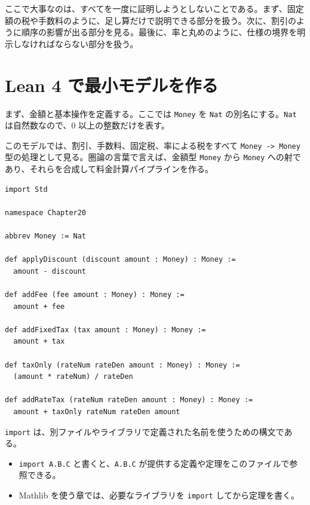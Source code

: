 ここで大事なのは、すべてを一度に証明しようとしないことである。まず、固定額の税や手数料のように、足し算だけで説明できる部分を扱う。次に、割引のように順序の影響が出る部分を見る。最後に、率と丸めのように、仕様の境界を明示しなければならない部分を扱う。

\section{Lean 4 で最小モデルを作る}

まず、金額と基本操作を定義する。ここでは \texttt{Money} を \texttt{Nat} の別名にする。\texttt{Nat} は自然数なので、0 以上の整数だけを表す。

\begin{leanbox}
このモデルでは、割引、手数料、固定税、率による税をすべて \texttt{Money -> Money} 型の処理として見る。圏論の言葉で言えば、金額型 \texttt{Money} から \texttt{Money} への射であり、それらを合成して料金計算パイプラインを作る。
\end{leanbox}

\begin{listing}[htbp]
\begin{verbatim}
import Std

namespace Chapter20

abbrev Money := Nat

def applyDiscount (discount amount : Money) : Money :=
  amount - discount

def addFee (fee amount : Money) : Money :=
  amount + fee

def addFixedTax (tax amount : Money) : Money :=
  amount + tax

def taxOnly (rateNum rateDen amount : Money) : Money :=
  (amount * rateNum) / rateDen

def addRateTax (rateNum rateDen amount : Money) : Money :=
  amount + taxOnly rateNum rateDen amount
\end{verbatim}
\caption{金額と基本操作の最小モデル}
\label{lst:ch20-money-model}
\end{listing}

\begin{syntaxbox}
\texttt{import} は、別ファイルやライブラリで定義された名前を使うための構文である。
\begin{itemize}
\item \texttt{import A.B.C} と書くと、\texttt{A.B.C} が提供する定義や定理をこのファイルで参照できる。
\item Mathlib を使う章では、必要なライブラリを \texttt{import} してから定理を書く。
\end{itemize}
\end{syntaxbox}


